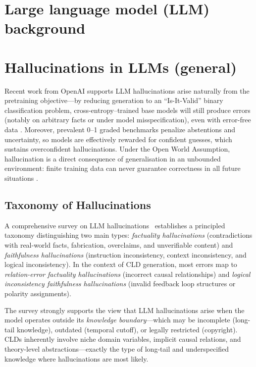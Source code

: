 \section{Large language model (LLM) background}
\label{sec:background_llms}



\section{Hallucinations in LLMs (general)}
\label{sec:background_hallucinations_general}

Recent work from OpenAI supports LLM hallucinations arise naturally from the pretraining objective---by reducing generation to an ``Is-It-Valid'' binary classification problem, cross-entropy--trained base models will still produce errors (notably on arbitrary facts or under model misspecification), even with error-free data \citep{kalai2025languagemodelshallucinate}. Moreover, prevalent 0--1 graded benchmarks penalize abstentions and uncertainty, so models are effectively rewarded for confident guesses, which sustains overconfident hallucinations. Under the Open World Assumption, hallucination is a direct consequence of generalisation in an unbounded environment: finite training data can never guarantee correctness in all future situations \citep{xu2025hallucination}.

\subsection{Taxonomy of Hallucinations}

A comprehensive survey on LLM hallucinations~\citep{huang2025hallucination} establishes a principled taxonomy distinguishing two main types: \textit{factuality hallucinations} (contradictions with real-world facts, fabrication, overclaims, and unverifiable content) and \textit{faithfulness hallucinations} (instruction inconsistency, context inconsistency, and logical inconsistency). In the context of CLD generation, most errors map to \textit{relation-error factuality hallucinations} (incorrect causal relationships) and \textit{logical inconsistency faithfulness hallucinations} (invalid feedback loop structures or polarity assignments).

The survey strongly supports the view that LLM hallucinations arise when the model operates outside its \textit{knowledge boundary}---which may be incomplete (long-tail knowledge), outdated (temporal cutoff), or legally restricted (copyright). CLDs inherently involve niche domain variables, implicit causal relations, and theory-level abstractions---exactly the type of long-tail and underspecified knowledge where hallucinations are most likely.

